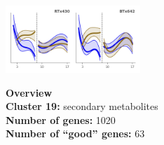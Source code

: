 \begin{multicols}{2}
\includegraphics[width=2in]{figures/clusters/leaf_Preflowering_18.png}
\columnbreak

\noindent \textbf{Overview}\\\textbf{Cluster 19:} secondary metabolites \\
\textbf{Number of genes:} 1020 \\
\textbf{Number of ``good'' genes:} 63 \\
\end{multicols}


